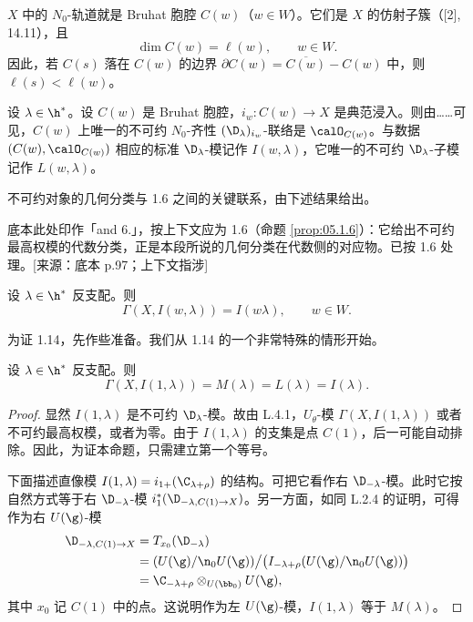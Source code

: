 $X$ 中的 $N_0$-轨道就是 Bruhat 胞腔 $C(w)$（$w\in W$）。它们是 $X$ 的仿射子簇（[2], 14.11），且
$$\dim C(w)=\ell(w),\qquad w\in W.$$
因此，若 $C(s)$ 落在 $C(w)$ 的边界 $\partial C(w)=\overline{C(w)}-C(w)$ 中，则 $\ell(s)<\ell(w)$。

设 $\lambda\in\h^*$。设 $C(w)$ 是 Bruhat 胞腔，$i_w:C(w)\to X$ 是典范浸入。则由……可见，$C(w)$ 上唯一的不可约 $N_0$-齐性 $(\D_\lambda)_{i_w}$-联络是 $\calO_{C(w)}$。与数据 $(C(w),\calO_{C(w)})$ 相应的标准 $\D_\lambda$-模记作 $I(w,\lambda)$，它唯一的不可约 $\D_\lambda$-子模记作 $L(w,\lambda)$。

不可约对象的几何分类与 1.6 之间的关键联系，由下述结果给出。
\begin{annote}
底本此处印作「and 6.」，按上下文应为 1.6（命题 \ref{prop:05.1.6}）：它给出不可约最高权模的代数分类，正是本段所说的几何分类在代数侧的对应物。已按 1.6 处理。[来源：底本 p.97；上下文指涉]
\end{annote}

\begin{theorem}\label{thm:05.1.14}
设 $\lambda\in\h^*$ 反支配。则
$$\Gamma(X,I(w,\lambda))=I(w\lambda),\qquad w\in W.$$
\end{theorem}

为证 1.14，先作些准备。我们从 1.14 的一个非常特殊的情形开始。

\begin{lemma}\label{lem:05.1.15}
设 $\lambda\in\h^*$ 反支配。则
$$\Gamma(X,I(1,\lambda))=M(\lambda)=L(\lambda)=I(\lambda).$$
\end{lemma}

\begin{proof}
显然 $I(1,\lambda)$ 是不可约 $\D_\lambda$-模。故由 L.4.1，$U_\theta$-模 $\Gamma(X,I(1,\lambda))$ 或者不可约最高权模，或者为零。由于 $I(1,\lambda)$ 的支集是点 $C(1)$，后一可能自动排除。因此，为证本命题，只需建立第一个等号。

下面描述直像模 $I(1,\lambda)=i_{1+}(\C_{\lambda+\rho})$ 的结构。可把它看作右 $\D_{-\lambda}$-模。此时它按自然方式等于右 $\D_{-\lambda}$-模 $i_1^*(\D_{-\lambda,C(1)\to X})$。另一方面，如同 L.2.4 的证明，可得作为右 $U(\g)$-模
\begin{align*}
\D_{-\lambda,C(1)\to X}&=T_{x_0}(\D_{-\lambda})\\
&=(U(\g)/\n_0U(\g))\big/\bigl(I_{-\lambda+\rho}(U(\g)/\n_0U(\g))\bigr)\\
&=\C_{-\lambda+\rho}\otimes_{U(\bb_0)}U(\g),
\end{align*}
其中 $x_0$ 记 $C(1)$ 中的点。这说明作为左 $U(\g)$-模，$I(1,\lambda)$ 等于 $M(\lambda)$。
\end{proof}

